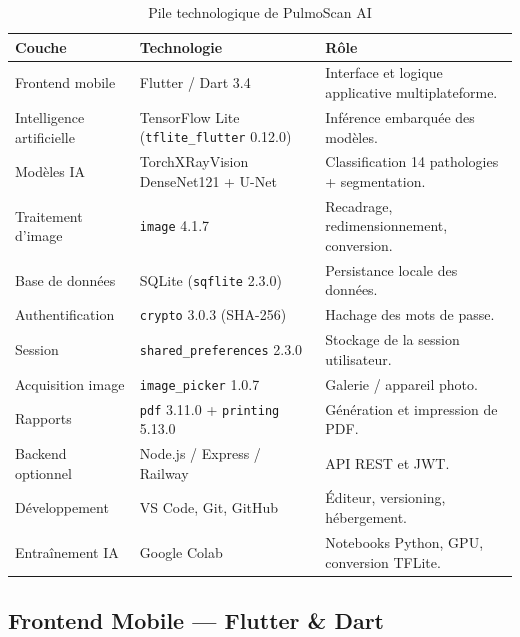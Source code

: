 \documentclass[12pt,a4paper]{report}
\begin{document}
\begin{table}[H]
\centering
\caption{Pile technologique de PulmoScan AI}
\label{tab:stack}
\begin{tabularx}{\textwidth}{l l X}
\toprule
\textbf{Couche} & \textbf{Technologie} & \textbf{Rôle} \\
\midrule
Frontend mobile & Flutter / Dart 3.4 & Interface et logique applicative multiplateforme. \\
Intelligence artificielle & TensorFlow Lite (\texttt{tflite\_flutter} 0.12.0) & Inférence embarquée des modèles. \\
Modèles IA & TorchXRayVision DenseNet121 + U-Net & Classification 14 pathologies + segmentation. \\
Traitement d'image & \texttt{image} 4.1.7 & Recadrage, redimensionnement, conversion. \\
Base de données & SQLite (\texttt{sqflite} 2.3.0) & Persistance locale des données. \\
Authentification & \texttt{crypto} 3.0.3 (SHA-256) & Hachage des mots de passe. \\
Session & \texttt{shared\_preferences} 2.3.0 & Stockage de la session utilisateur. \\
Acquisition image & \texttt{image\_picker} 1.0.7 & Galerie / appareil photo. \\
Rapports & \texttt{pdf} 3.11.0 + \texttt{printing} 5.13.0 & Génération et impression de PDF. \\
Backend optionnel & Node.js / Express / Railway & API REST et JWT. \\
Développement & VS Code, Git, GitHub & Éditeur, versioning, hébergement. \\
Entraînement IA & Google Colab & Notebooks Python, GPU, conversion TFLite. \\
\bottomrule
\end{tabularx}
\end{table}

\subsection{Frontend Mobile --- Flutter \& Dart}
\end{document}
